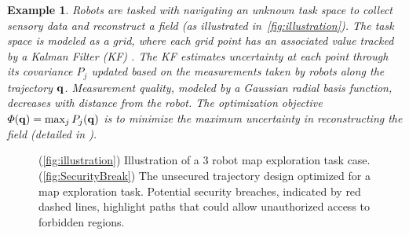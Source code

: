 \documentclass[10pt,twocolumn,twoside]{IEEEtran}
\newtheorem{example}{Example}
\begin{document}
\begin{example}\label{example:map_exploration}
Robots are tasked with navigating an unknown task space to collect sensory data and reconstruct a field (as illustrated in~\cref{fig:illustration}). The task space is modeled as a grid, where each grid point has an associated value tracked by a Kalman Filter (KF) \cite{anderson2012optimal}. The KF estimates uncertainty at each point through its covariance $P_j$ updated based on the measurements taken by robots along the trajectory $\mathbf{q}$. Measurement quality, modeled by a Gaussian radial basis function, decreases with distance from the robot. The optimization objective $\varPhi(\mathbf{q})=\max_j P_j(\mathbf{q})$ is to minimize the maximum uncertainty in reconstructing the field (detailed in \cite{yang2020multi}). 
\end{example}
\begin{figure}
  \centering
  \caption{(\ref{fig:illustration}) Illustration of a 3 robot map exploration task case. (\ref{fig:SecurityBreak}) The unsecured trajectory design optimized for a map exploration task. Potential security breaches, indicated by red dashed lines, highlight paths that could allow unauthorized access to forbidden regions.}
\end{figure}
\end{document}
